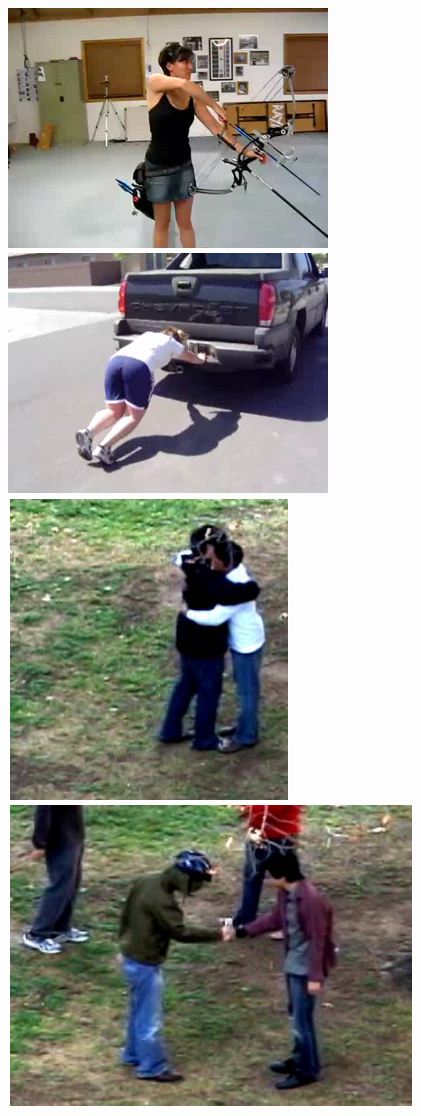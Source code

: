 \begin{figure}[!t]
\begin{center}
\includegraphics[scale=0.19]{cvpr14_figures/dataset_thumb/hmdb/class5.png} 
\includegraphics[scale=0.19]{cvpr14_figures/dataset_thumb/hmdb/class6.png} \\
\includegraphics[scale=0.32]{cvpr14_figures/dataset_thumb/uti/crop_class1.pdf} 
\includegraphics[scale=0.32]{cvpr14_figures/dataset_thumb/uti/crop_class2.pdf} 

\end{center}
\end{figure}
